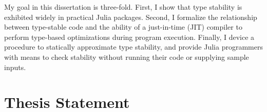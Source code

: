 My goal in this dissertation is three-fold.
%
First, I show that type stability is exhibited widely in practical Julia
packages.
%
Second, I formalize the relationship between type-stable code and the
ability of a just-in-time (JIT) compiler to perform type-based optimizations
during program execution.
%
Finally, I device a procedure to statically approximate type stability, and
provide Julia programmers with means to check stability without running their
code or supplying sample inputs.
%



\section{Thesis Statement}
\label{chap-problem}

